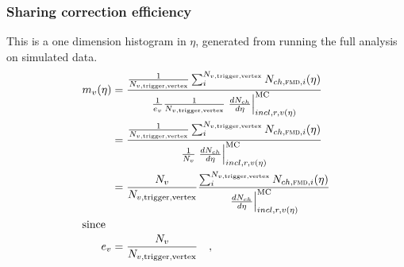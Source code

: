 \documentclass[11pt]{article}
\def\AlwaysText#1{\ifmmode\relax\text{#1}\else #1\fi}
\newcommand{\AbbrName}[1]{\AlwaysText{{\scshape #1}}}
\newcommand{\FMD}[1][]{\AbbrName{fmd\ifx|#1|\else#1\fi}}
\newcommand{\dndetadphi}[1][]{{\ensuremath%
    \ifx|#1|\else\left.\fi%
    \frac{d^2N_{ch}}{d\eta\,d\varphi}%
    \ifx|#1|\else\right|_{#1}\fi%
}}
\newcommand{\MC}{\AlwaysText{MC}}
\newcommand{\Nsel}{{\ensuremath N_{v,\text{trigger,vertex}}}}
\begin{document}
\subsubsection{Sharing correction efficiency}
  This is a one dimension histogram in $\eta$, generated from running
  the full analysis on simulated data.   
  \begin{align}
    \label{eq:sharing_corr}
    m_v(\eta) &=
    \frac{\frac1{\Nsel}\sum_i^{\Nsel{}}N_{ch,\text{\FMD{}},i}(\eta)}{
      \frac{1}{e_{v}}\frac1{\Nsel{}}\left.\frac{dN_{ch}}{d\eta}
      \right|_{incl,r,v(\eta)}^{\MC{}}}
    \nonumber\\
    &=
    \frac{\frac1{\Nsel}\sum_i^{\Nsel{}}N_{ch,\text{\FMD{}},i}(\eta)}{
      \frac1{N_v}\left.\frac{dN_{ch}}{d\eta}\right|_{incl,r,v(\eta)}^{\MC}}
    \nonumber\\
    &= 
    \frac{N_v}{\Nsel{}}
    \frac{\sum_i^{\Nsel{}}N_{ch,\text{\FMD{}},i}(\eta)}{
      \left.\frac{dN_{ch}}{d\eta}\right|_{incl,r,v(\eta)}^{\MC}}\\
    \intertext{since}
    e_{v} &= \frac{N_{v}}{\Nsel{}}\quad,
  \end{align}
\end{document}
